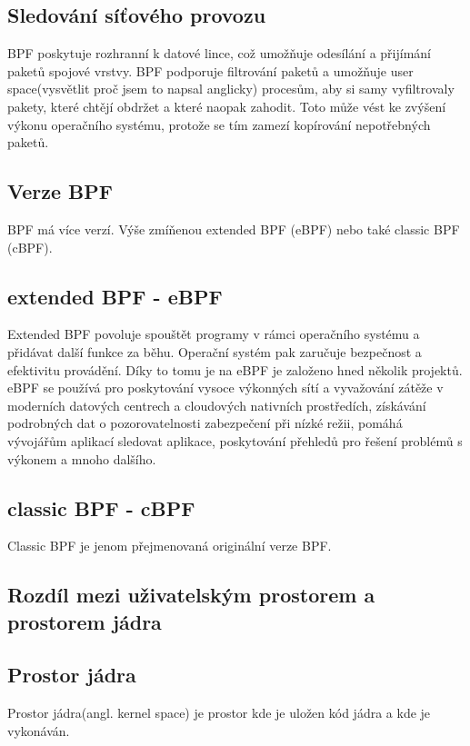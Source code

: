 \subsection*{Sledování síťového provozu}
BPF poskytuje rozhranní k datové lince, což umožňuje odesílání a přijímání paketů spojové vrstvy. BPF podporuje filtrování paketů a umožňuje user space(vysvětlit proč jsem to napsal anglicky) procesům,
aby si samy vyfiltrovaly pakety, které chtějí obdržet a které naopak zahodit. Toto může vést ke zvýšení výkonu operačního systému, protože se tím zamezí kopírování nepotřebných paketů.

\subsection*{Verze BPF}
BPF má více verzí. Výše zmíňenou extended BPF (eBPF) nebo také classic BPF (cBPF).

\subsection*{extended BPF - eBPF}
Extended BPF povoluje spouštět programy v rámci operačního systému a přidávat další funkce za běhu.
Operační systém pak zaručuje bezpečnost a efektivitu provádění. Díky to tomu je na eBPF je založeno hned několik projektů.
eBPF se používá pro  poskytování vysoce výkonných sítí a vyvažování zátěže v moderních datových centrech a cloudových nativních prostředích,
získávání podrobných dat o pozorovatelnosti zabezpečení při nízké režii, pomáhá vývojářům aplikací sledovat aplikace,
poskytování přehledů pro řešení problémů s výkonem a mnoho dalšího.

\subsection*{classic BPF - cBPF}
Classic BPF je jenom přejmenovaná originální verze BPF.

\iffalse
https://man7.org/linux/man-pages/man2/bpf.2.html
https://ebpf.io/
\fi

\subsection{Rozdíl mezi uživatelským prostorem a prostorem jádra}

\subsection*{Prostor jádra}
Prostor jádra(angl. kernel space) je prostor kde je uložen kód jádra a kde je vykonáván.

